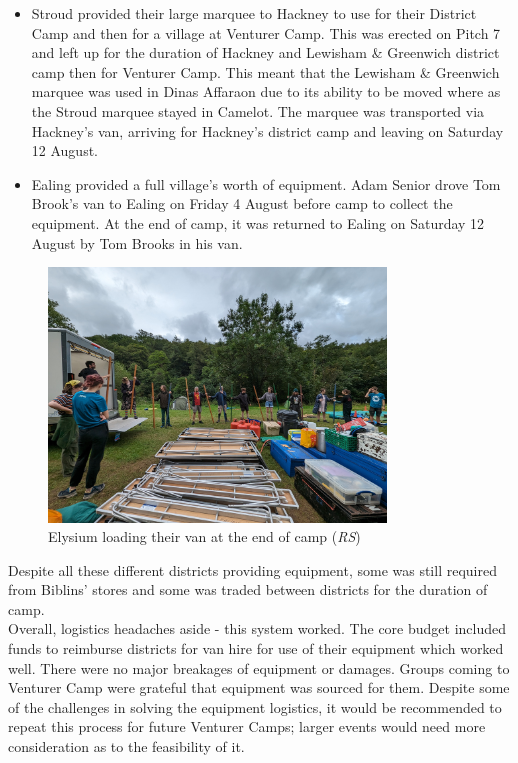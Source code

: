 \begin{itemize}
    \item Stroud provided their large marquee to Hackney to use for their District Camp and then for a village at Venturer Camp. This was erected on Pitch 7 and left up for the duration of Hackney and Lewisham \& Greenwich district camp then for Venturer Camp. This meant that the Lewisham \& Greenwich marquee was used in Dinas Affaraon due to its ability to be moved where as the Stroud marquee stayed in Camelot. The marquee was transported via Hackney's van, arriving for Hackney's district camp and leaving on Saturday 12 August.
    \item Ealing provided a full village's worth of equipment. Adam Senior drove Tom Brook's van to Ealing on Friday 4 August before camp to collect the equipment. At the end of camp, it was returned to Ealing on Saturday 12 August by Tom Brooks in his van.
\end{itemize}

\begin{figure}[ht]
    \centering
    \includegraphics[width=0.8\textwidth]{assets/van-loading-rs.jpg}
    \caption{Elysium loading their van at the end of camp (\textit{RS})}
\end{figure}

Despite all these different districts providing equipment, some was still required from Biblins' stores and some was traded between districts for the duration of camp. \\

Overall, logistics headaches aside - this system worked. The core budget included funds to reimburse districts for van hire for use of their equipment which worked well. There were no major breakages of equipment or damages. Groups coming to Venturer Camp were grateful that equipment was sourced for them. Despite some of the challenges in solving the equipment logistics, it would be recommended to repeat this process for future Venturer Camps; larger events would need more consideration as to the feasibility of it. \\

